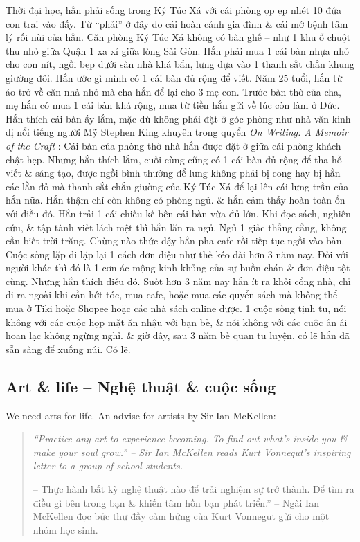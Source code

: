\documentclass[12pt]{article}
\begin{document}
Thời đại học, hắn phải sống trong Ký Túc Xá với cái phòng ọp ẹp nhét 10 đứa con trai vào đấy. Từ ``phải'' ở đây do cái hoàn cảnh gia đình \& cái mớ bệnh tâm lý rối nùi của hắn. Căn phòng Ký Túc Xá không có bàn ghế -- như 1 khu ổ chuột thu nhỏ giữa Quận 1 xa xỉ giữa lòng Sài Gòn. Hắn phải mua 1 cái bàn nhựa nhỏ cho con nít, ngồi bẹp dưới sàn nhà khá bẩn, lưng dựa vào 1 thanh sắt chắn khung giường đôi. Hắn ước gì mình có 1 cái bàn đủ rộng để viết. Năm 25 tuổi, hắn từ {\sc á}o trở về căn nhà nhỏ mà cha hắn để lại cho 3 mẹ con. Trước bàn thờ của cha, mẹ hắn có mua 1 cái bàn khá rộng, mua từ tiền hắn gửi về lúc còn làm ở Đức. Hắn thích cái bàn ấy lắm, mặc dù không phải đặt ở góc phòng như nhà văn kinh dị nổi tiếng người Mỹ {\sc Stephen King} khuyên trong quyển {\it On Writing: A Memoir of the Craft} \cite{King2000,King2010}: Cái bàn của phòng thờ nhà hắn được đặt ở giữa cái phòng khách chật hẹp. Nhưng hắn thích lắm, cuối cùng cũng có 1 cái bàn đủ rộng để tha hồ viết \& sáng tạo, được ngồi bình thường để lưng không phải bị cong hay bị hằn các lằn đỏ mà thanh sắt chắn giường của Ký Túc Xá để lại lên cái lưng trần của hắn nữa. Hắn thậm chí còn không có phòng ngủ. \& hắn cảm thấy hoàn toàn ổn với điều đó. Hắn trải 1 cái chiếu kế bên cái bàn vừa đủ lớn. Khi đọc sách, nghiên cứu, \& tập tành viết lách mệt thì hắn lăn ra ngủ. Ngủ 1 giấc thẳng cẳng, không cần biết trời trăng. Chừng nào thức dậy hắn pha cafe rồi tiếp tục ngồi vào bàn. Cuộc sống lặp đi lặp lại 1 cách đơn điệu như thế kéo dài hơn 3 năm nay. Đối với người khác thì đó là 1 cơn ác mộng kinh khủng của sự  buồn chán \& đơn điệu tột cùng. Nhưng hắn thích điều đó. Suốt hơn 3 năm nay hắn ít ra khỏi cổng nhà, chỉ đi ra ngoài khi cần hớt tóc, mua cafe, hoặc mua các quyển sách mà không thể mua ở Tiki hoặc Shopee hoặc các nhà sách online được. 1 cuộc sống tịnh tu, nói không với các cuộc họp mặt ăn nhậu với bạn bè, \& nói không với các cuộc ân ái hoan lạc không ngừng nghỉ. \& giờ đây, sau 3 năm bế quan tu luyện, có lẽ hắn đã sẵn sàng để xuống núi. Có lẽ.

\subsection{Art \& life -- Nghệ thuật \& cuộc sống}
We need arts for life. An advise for artists by Sir {\sc Ian McKellen}:
\begin{quotation}
	{\it``Practice any art to experience becoming. To find out what's inside you \& make your soul grow.'' -- Sir {\sc Ian McKellen} reads {\sc Kurt Vonnegut}'s inspiring letter to a group of school students.}
	
	-- Thực hành bất kỳ nghệ thuật nào để trải nghiệm sự trở thành. Để tìm ra điều gì bên trong bạn \& khiến tâm hồn bạn phát triển.'' -- Ngài {\sc Ian McKellen} đọc bức thư đầy cảm hứng của {\sc Kurt Vonnegut} gửi cho một nhóm học sinh.
\end{quotation}
\end{document}
